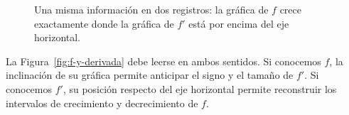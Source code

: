\begin{figure}[htbp]
\centering
\begin{minipage}{.48\textwidth}
\centering
{}
\end{minipage}\hfill
\begin{minipage}{.48\textwidth}
\centering
{}
\end{minipage}
\caption{Una misma información en dos registros: la gráfica de $f$ crece exactamente donde la gráfica de $f'$ está por encima del eje horizontal.}

\end{figure}

La Figura~\ref{fig:f-y-derivada} debe leerse en ambos sentidos. Si conocemos $f$, la inclinación de su gráfica permite anticipar el signo y el tamaño de $f'$. Si conocemos $f'$, su posición respecto del eje horizontal permite reconstruir los intervalos de crecimiento y decrecimiento de $f$.


